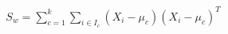 \documentclass[preview]{standalone}
\begin{document}
\begin{align*}
S_w = \sum_{c=1}^k \sum_{i \in I_c} (X_i - \mu_c)(X_i - \mu_c)^T
\end{align*}
\end{document}
